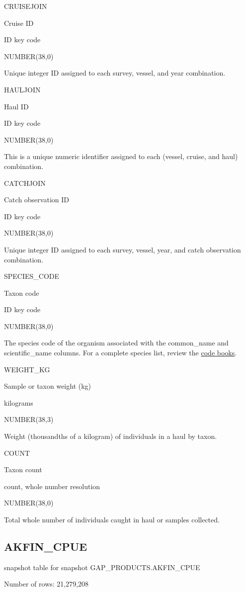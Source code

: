 \documentclass[
  letterpaper,
  oneside,
  open=any]{scrbook}
\begin{document}
CRUISEJOIN

Cruise ID

ID key code

NUMBER(38,0)

Unique integer ID assigned to each survey, vessel, and year combination.

HAULJOIN

Haul ID

ID key code

NUMBER(38,0)

This is a unique numeric identifier assigned to each (vessel, cruise,
and haul) combination.

CATCHJOIN

Catch observation ID

ID key code

NUMBER(38,0)

Unique integer ID assigned to each survey, vessel, year, and catch
observation combination.

SPECIES\_CODE

Taxon code

ID key code

NUMBER(38,0)

The species code of the organism associated with the common\_name and
scientific\_name columns. For a complete species list, review the
\href{https://www.fisheries.noaa.gov/resource/document/groundfish-survey-species-code-manual-and-data-codes-manual}{code
books}.

WEIGHT\_KG

Sample or taxon weight (kg)

kilograms

NUMBER(38,3)

Weight (thousandths of a kilogram) of individuals in a haul by taxon.

COUNT

Taxon count

count, whole number resolution

NUMBER(38,0)

Total whole number of individuals caught in haul or samples collected.

\subsection{AKFIN\_CPUE}\label{akfin_cpue}

snapshot table for snapshot GAP\_PRODUCTS.AKFIN\_CPUE

Number of rows: 21,279,208
\end{document}
